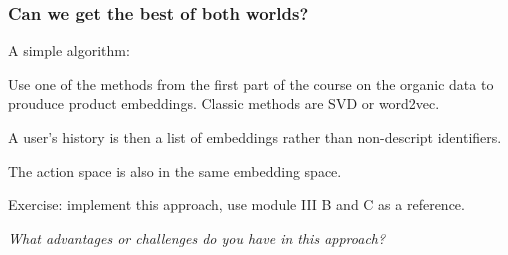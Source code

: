 \begin{frame}
  \frametitle{Can we get the best of both worlds?}

A simple algorithm:

\pause
Use one of the methods from the first part of the course on the organic data to prouduce product embeddings.  Classic methods are SVD or word2vec.

\pause

A user's history is then a list of embeddings rather than non-descript identifiers.

\pause

The action space is also in the same embedding space.

\pause

Exercise: implement this approach, use module III B and C as a reference.

\pause

\emph{What advantages or challenges do you have in this approach?}
\end{frame}
